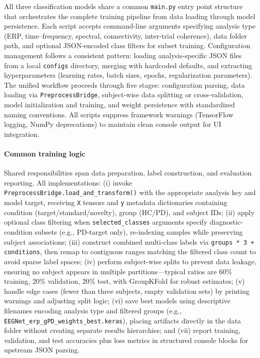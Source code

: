 \documentclass[12pt]{report}
\begin{document}
All three classification models share a common \texttt{main.py} entry point structure that orchestrates the complete training pipeline from data loading through model persistence. Each script accepts command-line arguments specifying analysis type (ERP, time--frequency, spectral, connectivity, inter-trial coherence), data folder path, and optional JSON-encoded class filters for subset training. Configuration management follows a consistent pattern: loading analysis-specific JSON files from a local \texttt{configs} directory, merging with hardcoded defaults, and extracting hyperparameters (learning rates, batch sizes, epochs, regularization parameters). The unified workflow proceeds through five stages: configuration parsing, data loading via \texttt{PreprocessBridge}, subject-wise data splitting or cross-validation, model initialization and training, and weight persistence with standardized naming conventions. All scripts suppress framework warnings (TensorFlow logging, NumPy deprecations) to maintain clean console output for UI integration.

\paragraph{Common training logic}\mbox{}

Shared responsibilities span data preparation, label construction, and evaluation reporting. All implementations: (i) invoke \texttt{PreprocessBridge.load\_and\_transform()} with the appropriate analysis key and model target, receiving \texttt{X} tensors and \texttt{y} metadata dictionaries containing condition (target/standard/novelty), group (HC/PD), and subject IDs; (ii) apply optional class filtering when \texttt{selected\_classes} arguments specify diagnostic-condition subsets (e.g., PD-target only), re-indexing samples while preserving subject associations; (iii) construct combined multi-class labels via \texttt{groups * 3 + conditions}, then remap to contiguous ranges matching the filtered class count to avoid sparse label spaces; (iv) perform subject-wise splits to prevent data leakage, ensuring no subject appears in multiple partitions—typical ratios are 60\% training, 20\% validation, 20\% test, with GroupKFold for robust estimates; (v) handle edge cases (fewer than three subjects, empty validation sets) by printing warnings and adjusting split logic; (vi) save best models using descriptive filenames encoding analysis type and filtered groups (e.g., \texttt{EEGNet\_erp\_gPD\_weights\_best.keras}), placing artifacts directly in the data folder without creating separate results hierarchies; and (vii) report training, validation, and test accuracies plus loss metrics in structured console blocks for upstream JSON parsing.
\end{document}
